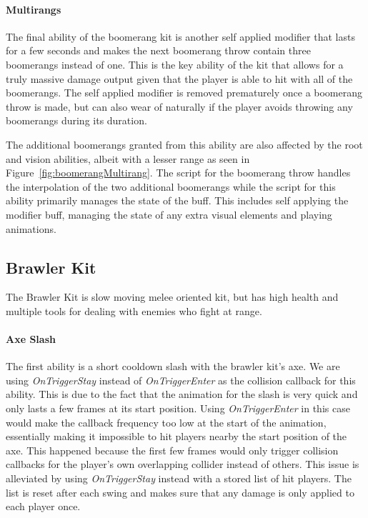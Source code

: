 \paragraph{Multirangs}
The final ability of the boomerang kit is another self applied modifier that lasts for a few seconds and makes the next boomerang throw contain three boomerangs instead of one. This is the key ability of the kit that allows for a truly massive damage output given that the player is able to hit with all of the boomerangs. The self applied modifier is removed prematurely once a boomerang throw is made, but can also wear of naturally if the player avoids throwing any boomerangs during its duration. 

The additional boomerangs granted from this ability are also affected by the root and vision abilities, albeit with a lesser range as seen in Figure~\ref{fig:boomerangMultirang}. The script for the boomerang throw handles the interpolation of the two additional boomerangs while the script for this ability primarily manages the state of the buff. This includes self applying the modifier buff, managing the state of any extra visual elements and playing animations. 


\subsection{Brawler Kit}
The Brawler Kit is slow moving melee oriented kit, but has high health and multiple tools for dealing with enemies who fight at range. 

\paragraph{Axe Slash}
The first ability is a short cooldown slash with the brawler kit's axe. We are using \emph{OnTriggerStay} instead of \emph{OnTriggerEnter} as the collision callback for this ability. This is due to the fact that the animation for the slash is very quick and only lasts a few frames at its start position. Using \emph{OnTriggerEnter} in this case would make the callback frequency too low at the start of the animation, essentially making it impossible to hit players nearby the start position of the axe. This happened because the first few frames would only trigger collision callbacks for the player's own overlapping collider instead of others. 
This issue is alleviated by using \emph{OnTriggerStay} instead with a stored list of hit players. The list is reset after each swing and makes sure that any damage is only applied to each player once. 

